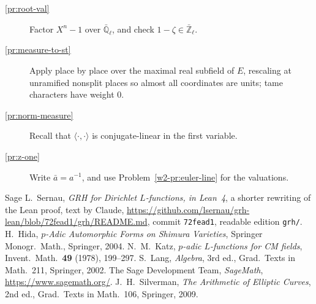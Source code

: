 \documentclass[reqno]{amsart}
\theoremstyle{definition}
\theoremstyle{plain}
\theoremstyle{remark}
\newcommand{\Ql}{\bar{\mathbb{Q}}_\ell}
\newcommand{\Zl}{\bar{\mathbb{Z}}_\ell}
\begin{document}
\begin{description}
\item[\ref{pr:root-val}] Factor \(X^n - 1\) over \(\Ql\), and check \(1 - \zeta \in \Zl\).
\item[\ref{pr:measure-to-st}] Apply \cite{La} place by place over the maximal real subfield of \(E\), rescaling at unramified nonsplit places so almost all coordinates are units; tame characters have weight \(0\).
\item[\ref{pr:norm-measure}] Recall that \(\langle\cdot, \cdot\rangle\) is conjugate-linear in the first variable.
\item[\ref{pr:z-one}] Write \(\bar a = a^{-1}\), and use Problem~\ref{w2-pr:euler-line} for the valuations.
\end{description}

{\small
\begin{thebibliography}{Sage}
 L.~Sernau, \emph{GRH for Dirichlet \(L\)-functions, in Lean~4}, a shorter rewriting of the Lean proof, text by Claude, \url{https://github.com/lsernau/grh-lean/blob/72fead1/grh/README.md}, commit \texttt{72fead1}, readable edition \texttt{grh/}.
 H.~Hida, \emph{\(p\)-Adic Automorphic Forms on Shimura Varieties}, Springer Monogr.\ Math., Springer, 2004.
 N.~M.~Katz, \emph{\(p\)-adic \(L\)-functions for CM fields}, Invent.\ Math.\ \textbf{49} (1978), 199--297.
 S.~Lang, \emph{Algebra}, 3rd ed., Grad.\ Texts in Math.\ 211, Springer, 2002.
 The Sage Development Team, \emph{SageMath}, \url{https://www.sagemath.org/}.
 J.~H.~Silverman, \emph{The Arithmetic of Elliptic Curves}, 2nd ed., Grad.\ Texts in Math.\ 106, Springer, 2009.
\end{thebibliography}
}
\end{document}
